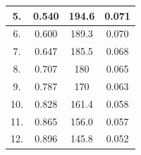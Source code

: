 \documentclass[a4paper,12pt]{article}
\begin{document}
\begin{table}[H]
{\begin{tabular}{|c|c|c|c|}
		5.                                                        & 0.540                                                                 & 194.6                                                                     & 0.071                                                                  \\ \hline
		6.                                                        & 0.600                                                                 & 189.3                                                                     & 0.070                                                                  \\ \hline
		7.                                                        & 0.647                                                                 & 185.5                                                                     & 0.068                                                                  \\ \hline
		8.                                                        & 0.707                                                                 & 180                                                                       & 0.065                                                                  \\ \hline
		9.                                                        & 0.787                                                                 & 170                                                                       & 0.063                                                                  \\ \hline
		10.                                                       & 0.828                                                                 & 161.4                                                                     & 0.058                                                                  \\ \hline
		11.                                                       & 0.865                                                                 & 156.0                                                                     & 0.057                                                                  \\ \hline
		12.                                                       & 0.896                                                                 & 145.8                                                                     & 0.052                                                                  \\ \hline

\end{tabular}}
\end{table}
\end{document}
